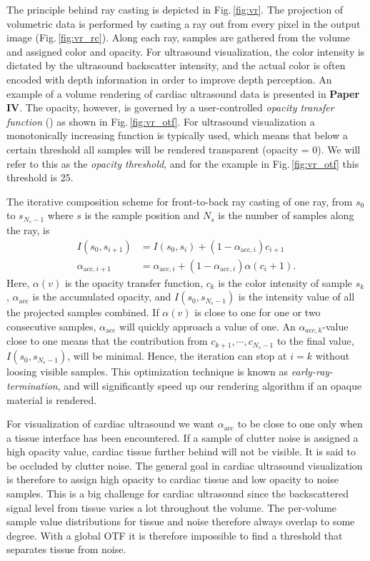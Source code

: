 The principle behind ray casting is depicted in Fig.\,\ref{fig:vr}. The projection of volumetric data is performed by casting a ray out from every pixel in the output image (Fig.\,\ref{fig:vr_rc}). Along each ray, samples are gathered from the volume and assigned color and opacity. For ultrasound visualization, the color intensity is dictated by the ultrasound backscatter intensity, and the actual color is often encoded with depth information in order to improve depth perception. An example of a volume rendering of cardiac ultrasound data is presented in \textbf{Paper IV}. The opacity, however, is governed by a user-controlled \textit{opacity transfer function} () as shown in Fig.\,\ref{fig:vr_otf}. For ultrasound visualization a monotonically increasing function is typically used, which means that below a certain threshold all samples will be rendered transparent (opacity = 0). We will refer to this as the \textit{opacity threshold}, and for the example in Fig.\,\ref{fig:vr_otf} this threshold is 25.

The iterative composition scheme for front-to-back ray casting of one ray, from $s_0$ to $s_{N_s-1}$ where $s$ is the sample position and $N_s$ is the number of samples along the ray, is \cite{rtvg2006}
\begin{align}
I(s_0, s_{i+1}) &= I(s_0, s_{i}) + (1 - \alpha_{\text{acc},i}) c_{i+1}\\
\alpha_{\text{acc},i+1} &= \alpha_{\text{acc},i} + (1 - \alpha_{\text{acc},i}) \alpha(c_i+1).
\label{eq:fronToBack}
\end{align}
Here, $\alpha(v)$ is the opacity transfer function, $c_{k}$ is the color intensity of sample $s_{k}$, $\alpha_{\text{acc}}$ is the accumulated opacity, and $I(s_0, s_{N_s-1})$ is the intensity value of all the projected samples combined. If $\alpha(v)$ is close to one for one or two consecutive samples, $\alpha_{\text{acc}}$ will quickly approach a value of one. An $\alpha_{acc,k}$-value close to one means that the contribution from $c_{k+1}, \cdots, c_{N_s-1}$ to the final value, $I(s_0, s_{N_s-1})$, will be minimal. Hence, the iteration can stop at $i=k$ without loosing visible samples. This optimization technique is known as \textit{early-ray-termination}, and will significantly speed up our rendering algorithm if an opaque material is rendered.

For visualization of cardiac ultrasound we want $\alpha_{\text{acc}}$ to be close to one only when a tissue interface has been encountered. If a sample of clutter noise is assigned a high opacity value, cardiac tissue further behind will not be visible. It is said to be occluded by clutter noise. The general goal in cardiac ultrasound visualization is therefore to assign high opacity to cardiac tissue and low opacity to noise samples. This is a big challenge for cardiac ultrasound since the backscattered signal level from tissue varies a lot throughout the volume. The per-volume sample value distributions for tissue and noise therefore always overlap to some degree. With a global OTF it is therefore impossible to find a threshold that separates tissue from noise.

